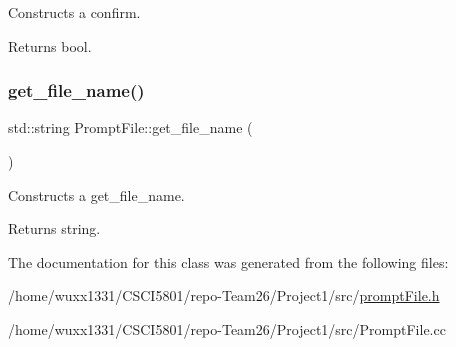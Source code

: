 Constructs a confirm. 

\begin{DoxyReturn}{Returns}
bool. 
\end{DoxyReturn}
\mbox{\label{classPromptFile_a69e3e7eab6eb5dcccd4e93285c0dbd34}} 
\subsubsection{\texorpdfstring{get\+\_\+file\+\_\+name()}{get\_file\_name()}}
{\footnotesize\ttfamily std\+::string Prompt\+File\+::get\+\_\+file\+\_\+name (\begin{DoxyParamCaption}{ }\end{DoxyParamCaption})}



Constructs a get\+\_\+file\+\_\+name. 

\begin{DoxyReturn}{Returns}
string. 
\end{DoxyReturn}


The documentation for this class was generated from the following files\+:\begin{DoxyCompactItemize}
\item 
/home/wuxx1331/\+C\+S\+C\+I5801/repo-\/\+Team26/\+Project1/src/\hyperlink{promptFile_8h}{prompt\+File.\+h}\item 
/home/wuxx1331/\+C\+S\+C\+I5801/repo-\/\+Team26/\+Project1/src/Prompt\+File.\+cc\end{DoxyCompactItemize}

